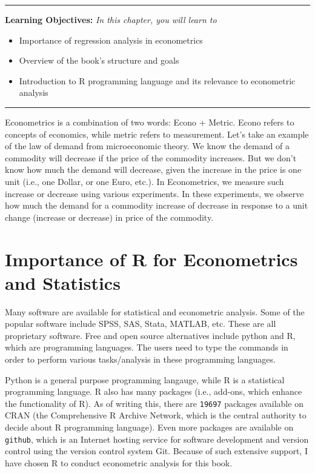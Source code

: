 \documentclass[
  letterpaper,
  twoside,
  openright,
  headsepline,
  footsepline,
  listof = totocnumbered,
  chapterprefix = true,
  titlepage = false]{scrbook}
\providecommand{\abstractname}{Learning Objectives} %
\newenvironment{objectives}[1]{%
	\hrule
	\vspace{5pt}
	\small\textbf{\abstractname: } 
	\newline
	\vspace{0.1cm}
	\small\emph{#1} %
	\itshape %
}{%
	\vspace{5pt}
	\hrule
	\vspace{0.6cm}
}
\begin{document}
\begin{objectives}{In this chapter, you will learn to}
\begin{itemize}

\item{Importance of regression analysis in econometrics}

\item{Overview of the book's structure and goals}

\item{Introduction to R programming language and its relevance to econometric analysis}

\end{itemize}

\end{objectives}

Econometrics is a combination of two words: Econo + Metric. Econo refers
to concepts of economics, while metric refers to measurement. Let's take
an example of the law of demand from microeconomic theory. We know the
demand of a commodity will decrease if the price of the commodity
increases. But we don't know how much the demand will decrease, given
the increase in the price is one unit (i.e., one Dollar, or one Euro,
etc.). In Econometrics, we measure such increase or decrease using
various experiments. In these experiments, we observe how much the
demand for a commodity increase of decrease in response to a unit change
(increase or decrease) in price of the commodity.

\hypertarget{importance-of-r-for-econometrics-and-statistics}{%
\section{Importance of R for Econometrics and
Statistics}\label{importance-of-r-for-econometrics-and-statistics}}

Many software are available for statistical and econometric analysis.
Some of the popular software include SPSS, SAS, Stata, MATLAB, etc.
These are all proprietary software. Free and open source alternatives
include python and R, which are programming languages. The users need to
type the commands in order to perform various tasks/analysis in these
programming languages.

Python is a general purpose programming langauge, while R is a
statistical programming language. R also has many packages (i.e.,
add-ons, which enhance the functionality of R). As of writing this,
there are \texttt{19697} packages available on CRAN (the Comprehensive R
Archive Network, which is the central authority to decide about R
programming language). Even more packages are available on
\texttt{github}, which is an Internet hosting service for software
development and version control using the version control system Git.
Because of such extensive support, I have chosen R to conduct
econometric analysis for this book.
\end{document}
